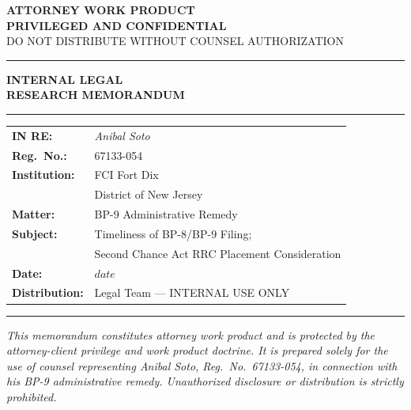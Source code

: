 \documentclass[12pt,letterpaper]{article}
\begin{document}
\begin{titlepage}
\thispagestyle{empty}
\begin{center}

\vspace*{0.6in}

{\Large\bfseries\textcolor{confRed}{ATTORNEY WORK PRODUCT}}\\[0.2em]
{\Large\bfseries\textcolor{confRed}{PRIVILEGED AND CONFIDENTIAL}}\\[0.2em]
{\normalsize\textcolor{confRed}{DO NOT DISTRIBUTE WITHOUT COUNSEL AUTHORIZATION}}

\vspace{0.4in}
{\color{ruleColor}\rule{5in}{1.5pt}}
\vspace{0.4in}

{\Huge\bfseries INTERNAL LEGAL}\\[0.15em]
{\Huge\bfseries RESEARCH MEMORANDUM}

\vspace{0.4in}
{\color{ruleColor}\rule{5in}{0.4pt}}
\vspace{0.4in}

\begin{tabular}{@{}ll@{}}
\textbf{IN RE:} & \textit{Anibal Soto} \\[0.4em]
\textbf{Reg.\ No.:} & 67133-054 \\[0.4em]
\textbf{Institution:} & FCI Fort Dix \\
               & District of New Jersey \\[0.4em]
\textbf{Matter:} & BP-9 Administrative Remedy \\[0.4em]
\textbf{Subject:} & Timeliness of BP-8/BP-9 Filing; \\
                  & Second Chance Act RRC Placement Consideration \\[0.8em]
\textbf{Date:} & $date$ \\[0.4em]
\textbf{Distribution:} & Legal Team --- INTERNAL USE ONLY \\
\end{tabular}

\vspace{0.4in}
{\color{ruleColor}\rule{5in}{0.4pt}}
\vspace{0.3in}

\begin{minipage}{4.5in}
\small\itshape
This memorandum constitutes attorney work product and is protected by
the attorney-client privilege and work product doctrine. It is prepared
solely for the use of counsel representing Anibal Soto, Reg.\ No.\
67133-054, in connection with his BP-9 administrative remedy. Unauthorized
disclosure or distribution is strictly prohibited.
\end{minipage}

\end{center}
\end{titlepage}
\end{document}
